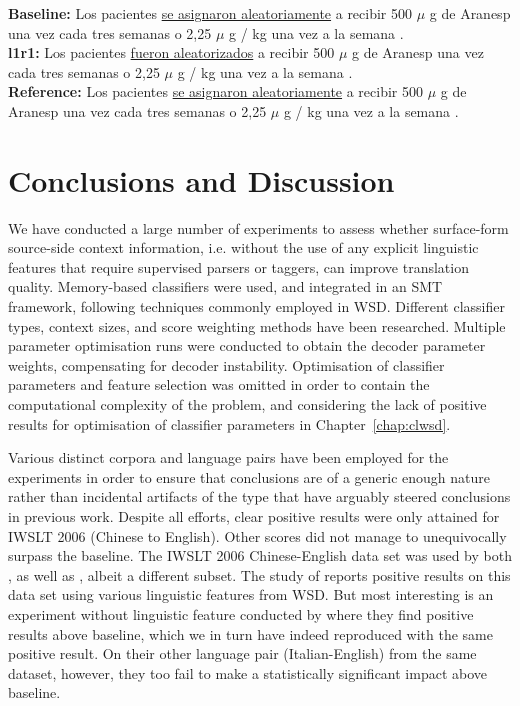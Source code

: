 \begin{exe}
\footnotesize
\ex \textbf{Baseline:} Los pacientes \underline{se asignaron aleatoriamente} a recibir 500 $\mu$ g de Aranesp una vez cada tres semanas o 2,25 $\mu$ g / kg una vez a la semana . \\
\textbf{l1r1:} Los pacientes \underline{fueron aleatorizados} a recibir 500 $\mu$ g de Aranesp una vez cada tres semanas o 2,25 $\mu$ g / kg una vez a la semana . \\
\textbf{Reference:} Los pacientes \underline{se asignaron aleatoriamente} a recibir 500 $\mu$ g de Aranesp una vez cada tres semanas o 2,25 $\mu$ g / kg una vez a la semana .
\label{ex:QAnegative}
\end{exe}


\section{Conclusions and Discussion} 
\label{sec:conclusion}

We have conducted a large number of experiments to assess whether surface-form
source-side context information, i.e. without the use of any explicit
linguistic features that require supervised parsers or taggers, can improve
translation quality. Memory-based classifiers were used, and integrated in an
SMT framework, following techniques commonly employed in WSD. Different
classifier types, context sizes, and score weighting methods have been
researched. Multiple parameter optimisation runs were conducted to obtain the
decoder parameter weights, compensating for decoder instability. Optimisation
of classifier parameters and feature selection was omitted in order to contain
the computational complexity of the problem, and considering the lack of positive
results for optimisation of classifier parameters in Chapter~\ref{chap:clwsd}.

Various distinct corpora and language pairs have been employed for the
experiments in order to ensure that conclusions are of a generic enough nature
rather than incidental artifacts of the type that have arguably steered
conclusions in previous work. Despite all efforts, clear positive results were
only attained for IWSLT 2006 (Chinese to English). Other scores did not manage
to unequivocally surpass the baseline. The IWSLT 2006 Chinese-English data set
was used by both \cite{CarpuatWu07}, as well as \cite{Stroppa+07}, albeit a
different subset. The study of \cite{CarpuatWu07} reports positive results on
this data set using various linguistic features from WSD. But most interesting
is an experiment without linguistic feature conducted by \cite{Stroppa+07}
where they find positive results above baseline, which we in turn have indeed
reproduced with the same positive result. On their other language pair
(Italian-English) from the same dataset, however, they too fail to make a
statistically significant impact above baseline. 

